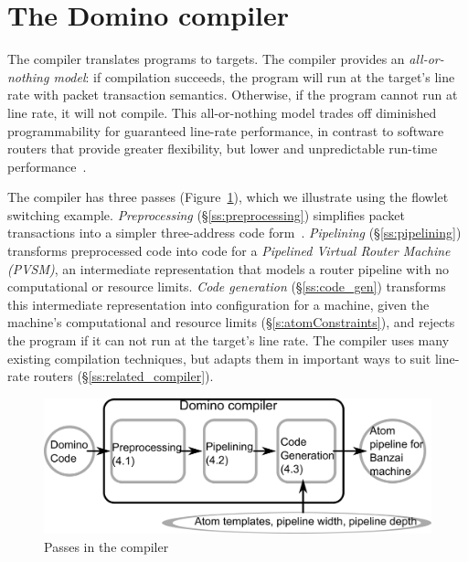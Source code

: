 \section{The Domino compiler}
\label{s:compiler}

The \pktlanguage compiler translates \pktlanguage programs to \absmachine
targets. The compiler provides an {\em all-or-nothing model}: if compilation
succeeds, the program will run at the target's line rate with packet
transaction semantics. Otherwise, if the program cannot run at line rate, it
will not compile. This all-or-nothing model trades off diminished
programmability for guaranteed line-rate performance, in contrast to software
routers that provide greater flexibility, but lower and unpredictable run-time
performance~\cite{dobrescu2012}.

The \pktlanguage compiler has three passes (Figure~\ref{fig:passes}), which we
illustrate using the flowlet switching example.  \textit{Preprocessing}
(\S\ref{ss:preprocessing}) simplifies packet transactions into a simpler
three-address code form~\cite{tac}.  \textit{Pipelining}
(\S\ref{ss:pipelining}) transforms preprocessed code into code for a
\textit{Pipelined Virtual Router Machine (PVSM)}, an intermediate
representation that models a router pipeline with no computational or resource
limits. \textit{Code generation} (\S\ref{ss:code_gen}) transforms this
intermediate representation into configuration for a \absmachine machine, given
the machine's computational and resource limits (\S\ref{s:atomConstraints}),
and rejects the program if it can not run at the target's line rate.  The
\pktlanguage compiler uses many existing compilation techniques, but adapts
them in important ways to suit line-rate routers (\S\ref{ss:related_compiler}).

\begin{figure}[!t]
  \centering
  \includegraphics[width=0.75\columnwidth]{domino_compiler.pdf}
  \caption{Passes in the \pktlanguage compiler}
  \label{fig:passes}
\end{figure}

